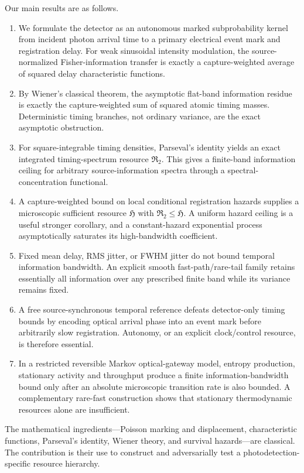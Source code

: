 \documentclass[aps,prapplied,preprint,nofootinbib]{revtex4-2}
\newcommand{\Rtwo}{\mathfrak R_2}
\newcommand{\Hcap}{\mathfrak H}
\begin{document}
Our main results are as follows.
\begin{enumerate}
\item We formulate the detector as an autonomous marked subprobability kernel from incident photon arrival time to a primary electrical event mark and registration delay.  For weak sinusoidal intensity modulation, the source-normalized Fisher-information transfer is exactly a capture-weighted average of squared delay characteristic functions.
\item By Wiener’s classical theorem, the asymptotic flat-band information residue is exactly the capture-weighted sum of squared atomic timing masses.  Deterministic timing branches, not ordinary variance, are the exact asymptotic obstruction.
\item For square-integrable timing densities, Parseval's identity yields an exact integrated timing-spectrum resource $\Rtwo$.  This gives a finite-band information ceiling for arbitrary source-information spectra through a spectral-concentration functional.
\item A capture-weighted bound on local conditional registration hazards supplies a microscopic sufficient resource $\Hcap$ with $\Rtwo\le \Hcap$.  A uniform hazard ceiling is a useful stronger corollary, and a constant-hazard exponential process asymptotically saturates its high-bandwidth coefficient.
\item Fixed mean delay, RMS jitter, or FWHM jitter do not bound temporal information bandwidth.  An explicit smooth fast-path/rare-tail family retains essentially all information over any prescribed finite band while its variance remains fixed.
\item A free source-synchronous temporal reference defeats detector-only timing bounds by encoding optical arrival phase into an event mark before arbitrarily slow registration.  Autonomy, or an explicit clock/control resource, is therefore essential.
\item In a restricted reversible Markov optical-gateway model, entropy production, stationary activity and throughput produce a finite information-bandwidth bound only after an absolute microscopic transition rate is also bounded.  A complementary rare-fast construction shows that stationary thermodynamic resources alone are insufficient.
\end{enumerate}

The mathematical ingredients---Poisson marking and displacement, characteristic functions, Parseval's identity, Wiener theory, and survival hazards---are classical.  The contribution is their use to construct and adversarially test a photodetection-specific resource hierarchy.
\end{document}
